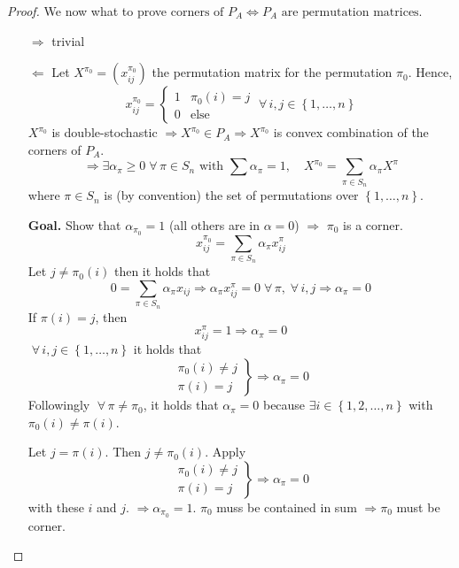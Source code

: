 \documentclass[a4paper]{article}
\theoremstyle{definition}
\newcommand{\set}[1]{\left\{#1\right\}}
\newcommand{\fall}{\;\forall\,}
\begin{document}
\begin{proof}
  We now what to prove $\text{corners of } P_A \Leftrightarrow P_A \text{ are permutation matrices}$.

  \begin{itemize}
    \item[$\Rightarrow$] trivial
    \item[$\Leftarrow$]
      Let $X^{\pi_0} = (x_{ij}^{\pi_0})$ the permutation matrix for the permutation $\pi_0$. Hence,
      \[
        x_{ij}^{\pi_0} = \left\{\begin{array}{ll}
          1 & \pi_0(i) = j \\
          0 & \text{else}
        \end{array}\right.
        \fall i, j \in \set{1, \ldots, n}
      \]
      $X^{\pi_0}$ is double-stochastic $\Rightarrow X^{\pi_0} \in P_A \Rightarrow X^{\pi_0}$ is convex combination of the corners of $P_A$.
      \[
        \Rightarrow \exists \alpha_\pi \geq 0 \fall \pi \in S_n
          \text{ with } \sum \alpha_\pi = 1,
          \quad X^{\pi_0} = \sum_{\pi \in S_n} \alpha_\pi X^\pi
      \]
      where $\pi \in S_n$ is (by convention) the set of permutations over $\set{1, \ldots, n}$.

      \textbf{Goal.} Show that $\alpha_{\pi_0} = 1$ (all others are in $\alpha = 0$) $\Rightarrow$ $\pi_0$ is a corner.
      \[ x_{ij}^{\pi_0} = \sum_{\pi \in S_n} \alpha_\pi x_{ij}^\pi \]
      Let $j \neq \pi_0(i)$ then it holds that
      \[
        0 = \sum_{\pi \in S_n} \alpha_\pi x_{ij} \Rightarrow
        \alpha_\pi x_{ij}^\pi = 0 \fall \pi, \fall i,j \Rightarrow
        \alpha_\pi = 0
      \]
      If $\pi(i) = j$, then
      \[ x^\pi_{ij} = 1 \Rightarrow \alpha_\pi = 0 \]
      $\fall i, j \in \set{1, \ldots, n}$ it holds that
      \[
        \left.\begin{array}{c}
          \pi_0(i) \neq j \\
          \pi(i) = j
        \end{array}\right\}
        \Rightarrow \alpha_\pi = 0
      \]
      Followingly $\fall \pi \neq \pi_0$, it holds that $\alpha_\pi = 0$ because $\exists i \in \set{1, 2, \ldots, n}$ with $\pi_0(i) \neq \pi(i)$.

      Let $j = \pi(i)$. Then $j \neq \pi_0(i)$. Apply
      \[
        \left.\begin{array}{c}
          \pi_0(i) \neq j \\
          \pi(i) = j
        \end{array}\right\}
        \Rightarrow \alpha_\pi = 0
      \]
      with these $i$ and $j$. $\Rightarrow \alpha_{\pi_0} = 1$. $\pi_0$ muss be contained in sum $\Rightarrow \pi_0$ must be corner.
  \end{itemize}
\end{proof}
\end{document}
